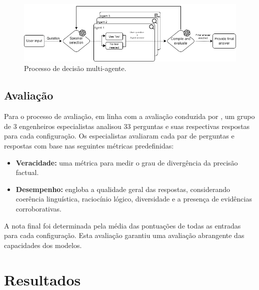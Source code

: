                 \begin{figure}[hbt]
                    \centering
                    \includegraphics[width=1\textwidth]{images/agent_diagram_2.png}
                    \caption{Processo de decisão multi-agente.}
                    \label{fig:diagrama_agente_MultiAgente_2}
                \end{figure}    
    
                
            \subsection{Avaliação}             
        
                Para o processo de avaliação, em linha com a avaliação conduzida por \cite{Li2023}, um grupo de 3 engenheiros especialistas analisou 33 perguntas e suas respectivas respostas para cada configuração. Os especialistas avaliaram cada par de perguntas e respostas com base nas seguintes métricas predefinidas:
        
                \begin{itemize}
                    
                    \item \textbf{Veracidade:} uma métrica para medir o grau de divergência da precisão factual.
                    
            
                    \item \textbf{Desempenho:} engloba a qualidade geral das respostas, considerando coerência linguística, raciocínio lógico, diversidade e a presença de evidências corroborativas.
                    
                \end{itemize}
                
                A nota final foi determinada pela média das pontuações de todas as entradas para cada configuração. Esta avaliação garantiu uma avaliação abrangente das capacidades dos modelos.
    
    
    \section{Resultados}
    
